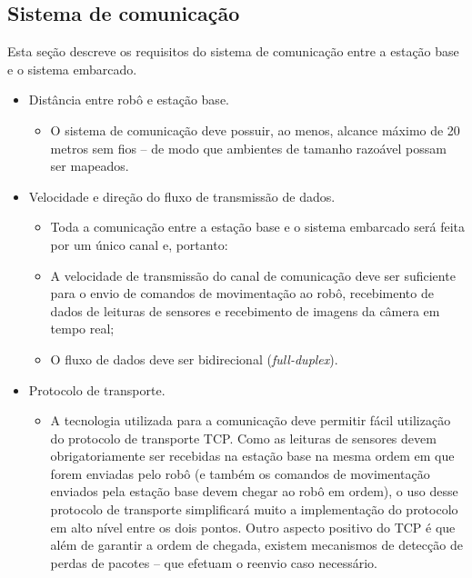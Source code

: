 \subsection{Sistema de comunicação}
Esta seção descreve os requisitos do sistema de comunicação entre a estação base e o sistema embarcado.

\begin{itemize} %

  \item Distância entre robô e estação base.
    \begin{itemize}
      \item O sistema de comunicação deve possuir, ao menos, alcance máximo de 20 metros sem fios -- de modo que ambientes de tamanho razoável possam ser mapeados.
    \end{itemize}

  \item Velocidade e direção do fluxo de transmissão de dados.
    \begin{itemize}
      \item Toda a comunicação entre a estação base e o sistema embarcado será feita por um único canal e, portanto:
      \item A velocidade de transmissão do canal de comunicação deve ser suficiente para o envio de comandos de movimentação ao robô, recebimento de dados de leituras de sensores e recebimento de imagens da câmera em tempo real; 
      \item O fluxo de dados deve ser bidirecional (\textit{full-duplex}).
    \end{itemize}

  \item Protocolo de transporte.
    \begin{itemize}
      \item A tecnologia utilizada para a comunicação deve permitir fácil utilização do protocolo de transporte TCP. Como as leituras de sensores devem obrigatoriamente ser recebidas na estação base na mesma ordem em que forem enviadas pelo robô (e também os comandos de movimentação enviados pela estação base devem chegar ao robô em ordem), o uso desse protocolo de transporte simplificará muito a implementação do protocolo em alto nível entre os dois pontos. Outro aspecto positivo do TCP é que além de garantir a ordem de chegada, existem mecanismos de detecção de perdas de pacotes -- que efetuam o reenvio caso necessário.
    \end{itemize}

\end{itemize} %



